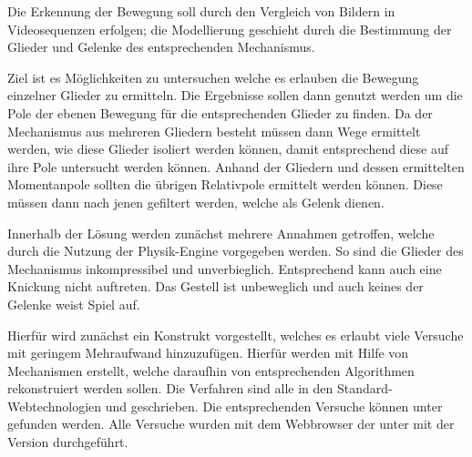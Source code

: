Die Erkennung der Bewegung soll durch den Vergleich von Bildern in Videosequenzen erfolgen; die Modellierung geschieht durch die Bestimmung der Glieder und Gelenke des entsprechenden Mechanismus.

Ziel ist es Möglichkeiten zu untersuchen welche es erlauben die Bewegung einzelner Glieder zu ermitteln.
Die Ergebnisse sollen dann genutzt werden um die Pole der ebenen Bewegung für die entsprechenden Glieder zu finden.
Da der Mechanismus aus mehreren Gliedern besteht müssen dann Wege ermittelt werden, wie diese Glieder isoliert werden können, damit entsprechend diese auf ihre Pole untersucht werden können.
Anhand der Gliedern und dessen ermittelten Momentanpole sollten die übrigen Relativpole ermittelt werden können.
Diese müssen dann nach jenen gefiltert werden, welche als Gelenk dienen.

Innerhalb der Lösung werden zunächst mehrere Annahmen getroffen, welche durch die Nutzung der Physik-Engine  vorgegeben werden.
So sind die Glieder des Mechanismus inkompressibel und unverbieglich.
Entsprechend kann auch eine Knickung nicht auftreten.
Das Gestell ist unbeweglich und auch keines der Gelenke weist Spiel auf.

Hierfür wird zunächst ein Konstrukt vorgestellt, welches es erlaubt viele Versuche mit geringem Mehraufwand hinzuzufügen.
Hierfür werden mit Hilfe von  Mechanismen erstellt, welche daraufhin von entsprechenden Algorithmen rekonstruiert werden sollen.
Die Verfahren sind alle in den Standard-Webtechnologien  und  geschrieben.
Die entsprechenden Versuche können unter  gefunden werden.
Alle Versuche wurden mit dem Webbrowser  der  unter  mit der Version  durchgeführt.
